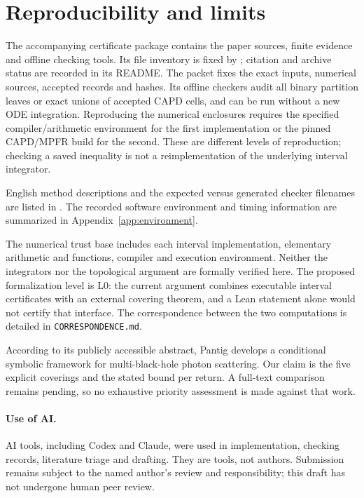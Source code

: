 \section{Reproducibility and limits}

The accompanying certificate package contains the paper sources,
finite evidence and offline checking tools. Its file inventory is fixed by
; citation and archive status are recorded in its README.
The packet fixes the exact inputs, numerical
sources, accepted records and hashes. Its offline checkers audit all binary
partition leaves or exact unions of accepted CAPD cells, and can be run
without a new ODE integration. Reproducing the numerical enclosures requires
the specified compiler/arithmetic environment for the first implementation
or the pinned CAPD/MPFR build for the second. These are different levels of
reproduction; checking a saved inequality is not a reimplementation of the
underlying interval integrator.

English method descriptions and the expected versus generated checker
filenames are listed in . The recorded software
environment and timing information are summarized in
Appendix~\ref{app:environment}.

The numerical trust base includes each interval implementation, elementary
arithmetic and functions, compiler and execution environment. Neither the
integrators nor the topological argument are formally verified here. The
proposed formalization level is L0: the current argument combines executable
interval certificates with an external covering theorem, and a Lean
statement alone would not certify that interface. The correspondence between the two computations is detailed in
\texttt{CORRESPONDENCE.md}.

According to its publicly accessible abstract, Pantig \cite{Pantig} develops
a conditional symbolic framework for multi-black-hole photon scattering.
Our claim is the five explicit coverings and the stated bound per return.
A full-text comparison remains pending, so no exhaustive priority assessment
is made against that work.

\paragraph{Use of AI.}
AI tools, including Codex and Claude, were used in implementation, checking
records, literature triage and drafting. They are tools, not authors.
Submission remains subject to the named author's review and responsibility;
this draft has not undergone human peer review.


